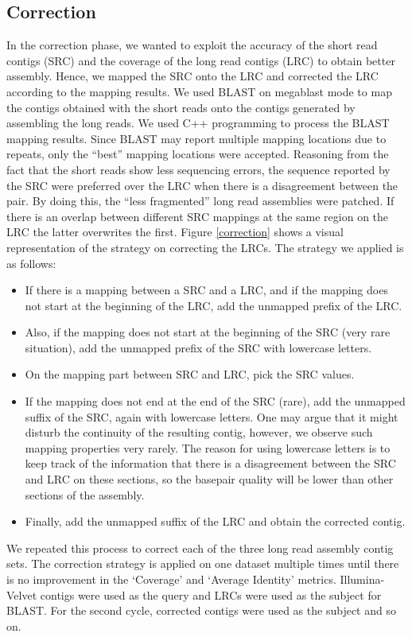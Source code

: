 \documentclass{llncs}
\begin{document}
\subsection{Correction} 
In the correction phase, we wanted to exploit the accuracy of the short read contigs (SRC) and the coverage of the long read contigs (LRC) to obtain better assembly. 
Hence, we mapped the SRC onto the LRC and corrected the LRC according to the mapping results.
We used BLAST \cite{blast} on megablast mode to map the contigs obtained with the short reads onto the contigs generated by assembling the long reads. 
We used C++ programming to process the BLAST mapping results. 
Since BLAST may report multiple mapping locations due to repeats, only the ``best'' mapping locations were accepted. 
Reasoning from the fact that the short reads show less sequencing errors, the sequence reported by the SRC were preferred over the LRC when there is a disagreement between the pair. 
By doing this, the ``less fragmented'' long read assemblies were patched. 
If there is an overlap between different SRC mappings at the same region on the LRC the latter overwrites the first. 
Figure \ref{correction} shows a visual representation of the strategy on correcting the LRCs. 
The strategy we applied is as follows: 
\begin{itemize}
\item If there is a mapping between a SRC and a LRC, and if the mapping does not start at the beginning of the LRC, add the unmapped prefix of the LRC. 
\item Also, if the mapping does not start at the beginning of the SRC (very rare situation), add the unmapped prefix of the SRC with lowercase letters. 
\item On the mapping part between SRC and LRC, pick the SRC values. 
\item If the mapping does not end at the end of the SRC (rare), add the unmapped suffix of the SRC, again with lowercase letters. One may argue that it might disturb the continuity of the resulting contig, however, we observe such mapping properties very rarely. The reason for using lowercase letters is to keep track of the information that there is a disagreement between the SRC and LRC on these sections, so the basepair quality will be lower than other sections of the assembly. 
\item Finally, add the unmapped suffix of the LRC and obtain the corrected contig.
\end{itemize}
We repeated this process to correct each of the three long read assembly contig sets. The correction strategy is applied on one dataset multiple times until there is no improvement in the `Coverage' and `Average Identity' metrics. Illumina-Velvet contigs were used as the query and LRCs were used as the subject for BLAST. For the second cycle, corrected contigs were used as the subject and so on.
\end{document}
